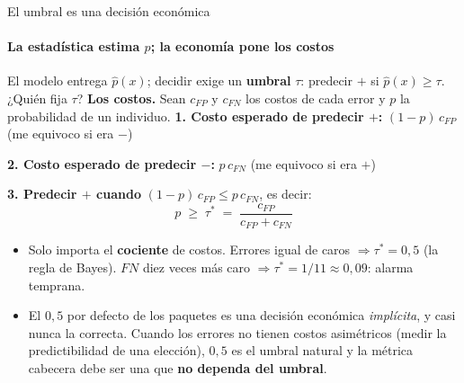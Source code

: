 \documentclass{beamer}
\newcommand{\1}{\mathbb{I}}
\begin{document}
\begin{frame}{El umbral es una decisión económica}
\framesubtitle{La estadística estima $p$; la economía pone los costos}
\small
El modelo entrega $\hat{p}(x)$; decidir exige un \textbf{umbral} $\tau$: predecir $+$ si $\hat{p}(x) \geq \tau$. ¿Quién fija $\tau$? \textbf{Los costos.} Sean $c_{FP}$ y $c_{FN}$ los costos de cada error y $p$ la probabilidad de un individuo.
\pause
\vspace{0.1cm}
\textbf{1. Costo esperado de predecir $+$:} \quad $(1 - p)\, c_{FP}$ \hfill (me equivoco si era $-$)

\textbf{2. Costo esperado de predecir $-$:} \quad $p\, c_{FN}$ \hfill (me equivoco si era $+$)
\pause

\textbf{3. Predecir $+$ cuando} $(1-p)\,c_{FP} \leq p\, c_{FN}$, es decir:
\[ \boxed{ \; p \;\geq\; \tau^{*} \;=\; \frac{c_{FP}}{c_{FP} + c_{FN}} \; } \]
\pause
\begin{itemize}\itemsep4pt
  \item Solo importa el \textbf{cociente} de costos. Errores igual de caros $\Rightarrow \tau^* = 0{,}5$ (la regla de Bayes). $FN$ diez veces más caro $\Rightarrow \tau^* = 1/11 \approx 0{,}09$: alarma temprana.
  \item El $0{,}5$ por defecto de los paquetes es una decisión económica \emph{implícita}, y casi nunca la correcta. Cuando los errores no tienen costos asimétricos (medir la predictibilidad de una elección), $0{,}5$ es el umbral natural y la métrica cabecera debe ser una que \textbf{no dependa del umbral}.
\end{itemize}
\end{frame}
\end{document}
